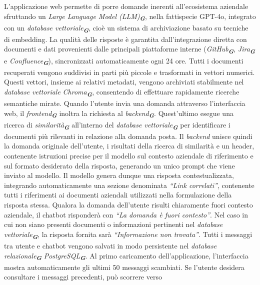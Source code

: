 L’applicazione web permette di porre domande inerenti all’ecosistema aziendale sfruttando un \emph{Large Language Model (LLM)}\textsubscript{\textbf{\textit{G}}}, 
nella fattispecie GPT-4o, integrato con un \emph{database vettoriale}\textsubscript{\textbf{\textit{G}}}, cioè un sistema 
di archiviazione basato su tecniche di embedding.
La qualità delle risposte è garantita dall'integrazione diretta con documenti e dati provenienti dalle principali piattaforme interne 
(\emph{GitHub}\textsubscript{\textbf{\textit{G}}}, \emph{Jira}\textsubscript{\textbf{\textit{G}}} e \emph{Confluence}\textsubscript{\textbf{\textit{G}}}), sincronizzati 
automaticamente ogni 24 ore. Tutti i documenti recuperati vengono suddivisi in parti più piccole e trasformati in vettori numerici. Questi vettori, insieme ai relativi metadati, 
vengono archiviati stabilmente nel \emph{database vettoriale} \emph{Chroma}\textsubscript{\textbf{\textit{G}}}, consentendo di effettuare 
rapidamente ricerche semantiche mirate.
Quando l’utente invia una domanda attraverso l’interfaccia web, il \emph{frontend}\textsubscript{\textbf{\textit{G}}} inoltra la richiesta al 
\emph{backend}\textsubscript{\textbf{\textit{G}}}. Quest’ultimo esegue una ricerca di \emph{similarità}\textsubscript{\textbf{\textit{G}}} all'interno del \emph{database vettoriale}\textsubscript{\textbf{\textit{G}}} 
per identificare i documenti più rilevanti in relazione alla domanda posta. Il \emph{backend} unisce quindi la domanda originale dell’utente, 
i risultati della ricerca di similarità e un header, contenente istruzioni precise per il modello sul contesto aziendale di riferimento e sul formato desiderato della risposta, generando un unico prompt che viene inviato al modello.
Il modello genera dunque una risposta contestualizzata, integrando automaticamente una sezione denominata \emph{“Link correlati”}, contenente tutti i riferimenti ai documenti 
aziendali utilizzati nella formulazione della risposta stessa. Qualora la domanda dell'utente risulti chiaramente fuori contesto aziendale, il chatbot risponderà con 
\emph{“La domanda è fuori contesto”}. Nel caso in cui non siano presenti documenti o informazioni pertinenti nel \emph{database vettoriale}\textsubscript{\textbf{\textit{G}}}, la 
risposta fornita sarà \emph{“Informazione non trovata”}.
Tutti i messaggi tra utente e chatbot vengono salvati in modo persistente nel \emph{database relazionale}\textsubscript{\textbf{\textit{G}}} \emph{PostgreSQL}\textsubscript{\textbf{\textit{G}}}. Al primo caricamento 
dell’applicazione, l'interfaccia mostra automaticamente gli ultimi 50 messaggi scambiati. Se l'utente desidera consultare i messaggi precedenti, può scorrere verso 
